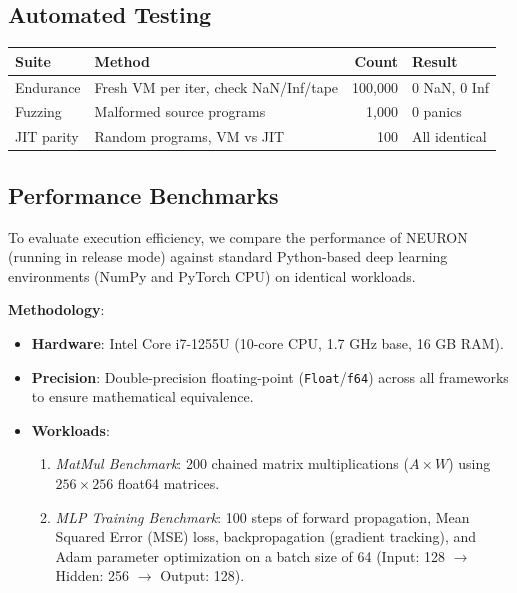 \documentclass[11pt,a4paper]{article}
\begin{document}
\subsection{Automated Testing}

\begin{center}
\begin{tabular}{llrl}
\toprule
\textbf{Suite} & \textbf{Method} & \textbf{Count} & \textbf{Result} \\
\midrule
Endurance & Fresh VM per iter, check NaN/Inf/tape & 100,000 & 0 NaN, 0 Inf \\
Fuzzing & Malformed source programs & 1,000 & 0 panics \\
JIT parity & Random programs, VM vs JIT & 100 & All identical \\
\bottomrule
\end{tabular}
\end{center}

\subsection{Performance Benchmarks}

To evaluate execution efficiency, we compare the performance of NEURON (running in release mode) against standard Python-based deep learning environments (NumPy and PyTorch CPU) on identical workloads.

\textbf{Methodology}:
\begin{itemize}[itemsep=2pt]
  \item \textbf{Hardware}: Intel Core i7-1255U (10-core CPU, 1.7 GHz base, 16 GB RAM).
  \item \textbf{Precision}: Double-precision floating-point (\texttt{Float}/\texttt{f64}) across all frameworks to ensure mathematical equivalence.
  \item \textbf{Workloads}:
  \begin{enumerate}[itemsep=2pt]
    \item \emph{MatMul Benchmark}: 200 chained matrix multiplications ($A \times W$) using $256 \times 256$ float64 matrices.
    \item \emph{MLP Training Benchmark}: 100 steps of forward propagation, Mean Squared Error (MSE) loss, backpropagation (gradient tracking), and Adam parameter optimization on a batch size of 64 (Input: 128 $\to$ Hidden: 256 $\to$ Output: 128).
  \end{enumerate}
\end{itemize}
\end{document}

